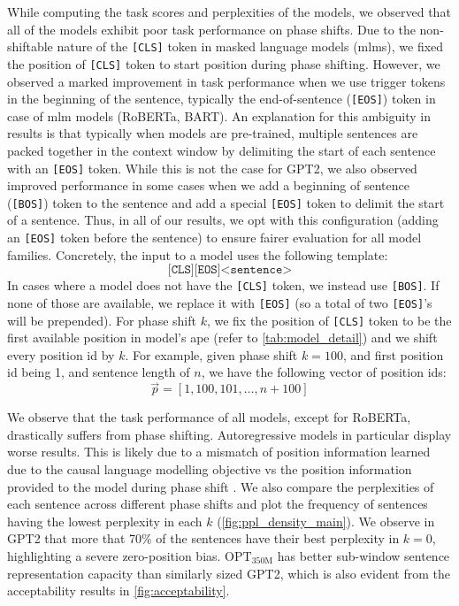 \documentclass[letterpaper, 12pt]{report}
\begin{document}
While computing the task scores and perplexities of the models, we observed that all of the models exhibit poor task performance on phase shifts.
Due to the non-shiftable nature of the \texttt{[CLS]} token in masked language models (\acrshort{mlm}s), we fixed the position of \texttt{[CLS]} token to start position during phase shifting.
However, we observed a marked improvement in task performance when we use trigger tokens in the beginning of the sentence, typically the end-of-sentence (\texttt{[EOS]}) token in case of \acrshort{mlm} models (RoBERTa, BART).
An explanation for this ambiguity in results is that typically when models are pre-trained, multiple sentences are packed together in the context window by delimiting the start of each sentence with an \texttt{[EOS]} token.
While this is not the case for GPT2, we also observed improved performance in some cases when we add a beginning of sentence (\texttt{[BOS]}) token to the sentence and add a special \texttt{[EOS]} token to delimit the start of a sentence. Thus, in all of our results, we opt with this configuration (adding an \texttt{[EOS]} token before the sentence) to ensure fairer evaluation for all model families.
Concretely, the input to a model uses the following template:
$$
\texttt{[CLS]}\texttt{[EOS]} \texttt{<sentence>}
$$
In cases where a model does not have the \texttt{[CLS]} token, we instead use \texttt{[BOS]}.
If none of those are available, we replace it with \texttt{[EOS]} (so a total of two \texttt{[EOS]}'s will be prepended).
For phase shift $k$, we fix the position of \texttt{[CLS]} token to be the first available position in model's \acrshort{ape} (refer to \autoref{tab:model_detail}) and we shift every position id by $k$.
For example, given phase shift $k=100$, and first position id being 1, and sentence length of $n$, we have the following vector of position ids:
$$
\Vec{p} = [1, 100, 101, \dots, n+100]
$$


We observe that the task performance of all models, except for RoBERTa, drastically suffers from phase shifting. Autoregressive models in particular display worse results. This is likely due to a mismatch of position information learned due to the causal language modelling objective vs the position information provided to the model during phase shift \citep{haviv2022}. We also compare the perplexities of each sentence across different phase shifts and plot the frequency of sentences having the lowest perplexity in each $k$ (\autoref{fig:ppl_density_main}). We observe in GPT2 that more that 70\% of the sentences have their best perplexity in $k=0$, highlighting a severe zero-position bias. $\text{OPT}_{\text{350M}}$ has better sub-window sentence representation capacity than similarly sized GPT2, which is also evident from the acceptability results in \autoref{fig:acceptability}.
\end{document}
